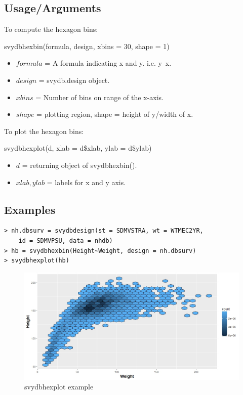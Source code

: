 \subsection{Usage/Arguments} \label{c.3.1.1}
To compute the hexagon bins:
\begin{center}
    {\ttfamily svydbhexbin(formula, design, xbins = 30, shape = 1)}
\end{center}

\begin{itemize}
\item $formula$ = A formula indicating x and y. i.e. y~x.

\item $design$ = svydb.design object.

\item $xbins$ = Number of bins on range of the x-axis.

\item $shape$ = plotting region, shape = height of y/width of x.
\end{itemize}

To plot the hexagon bins:
\begin{center}
    {\ttfamily svydbhexplot(d, xlab = d\$xlab, ylab = d\$ylab)}
\end{center}

\begin{itemize}
\item $d$ = returning object of {\ttfamily svydbhexbin()}.

\item $xlab, ylab$ = labels for x and y axis.
\end{itemize}

\newpage

\subsection{Examples} \label{c.3.1.2}
\begin{lstlisting}
> nh.dbsurv = svydbdesign(st = SDMVSTRA, wt = WTMEC2YR, 
    id = SDMVPSU, data = nhdb)
> hb = svydbhexbin(Height~Weight, design = nh.dbsurv)
> svydbhexplot(hb)
\end{lstlisting}


\begin{figure}[h]
    \centering
    \includegraphics[scale = 0.55]{img/hex-e.jpeg}
    \caption{{\ttfamily svydbhexplot} example}
    \label{fig:hex-e}
\end{figure}

